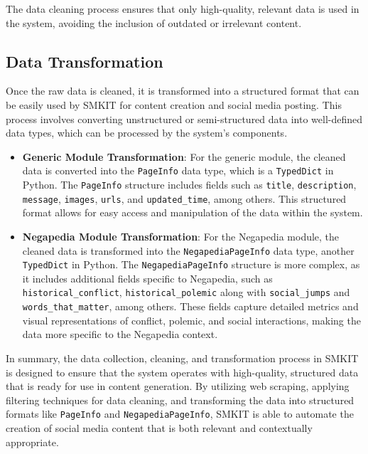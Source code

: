 The data cleaning process ensures that only high-quality, relevant data is used in the system, avoiding the inclusion of outdated or irrelevant content.

\subsection{Data Transformation}
\label{subsec:data_transformation}
Once the raw data is cleaned, it is transformed into a structured format that can be easily used by SMKIT for content creation and social media posting. This process involves converting unstructured or semi-structured data into well-defined data types, which can be processed by the system’s components.

\begin{itemize}
    \item \textbf{Generic Module Transformation}: For the generic module, the cleaned data is converted into the \texttt{PageInfo} data type, which is a \texttt{TypedDict} in Python. The \texttt{PageInfo} structure includes fields such as \texttt{title}, \texttt{description}, \texttt{message}, \texttt{images}, \texttt{urls}, and \texttt{updated\_time}, among others. This structured format allows for easy access and manipulation of the data within the system.
    \item \textbf{Negapedia Module Transformation}: For the Negapedia module, the cleaned data is transformed into the \texttt{NegapediaPageInfo} data type, another \texttt{TypedDict} in Python. The \texttt{NegapediaPageInfo} structure is more complex, as it includes additional fields specific to Negapedia, such as \texttt{historical\_conflict}, \texttt{historical\_polemic} along with \texttt{social\_jumps} and \texttt{words\_that\_matter}, among others. These fields capture detailed metrics and visual representations of conflict, polemic, and social interactions, making the data more specific to the Negapedia context.
\end{itemize}

In summary, the data collection, cleaning, and transformation process in SMKIT is designed to ensure that the system operates with high-quality, structured data that is ready for use in content generation. By utilizing web scraping, applying filtering techniques for data cleaning, and transforming the data into structured formats like \texttt{PageInfo} and \texttt{NegapediaPageInfo}, SMKIT is able to automate the creation of social media content that is both relevant and contextually appropriate.


